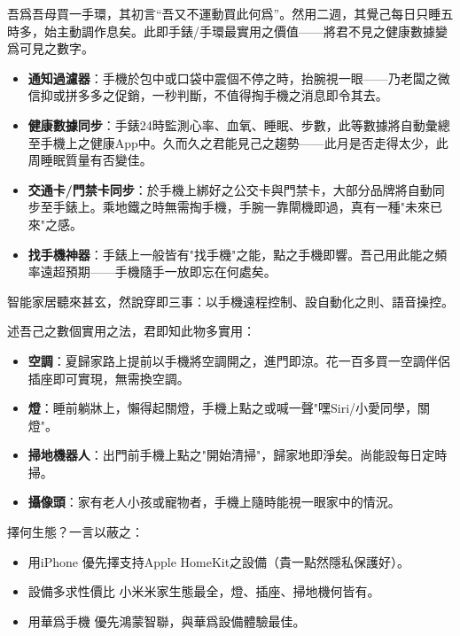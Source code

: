 
吾爲吾母買一手環，其初言“吾又不運動買此何爲”。然用二週，其覺己每日只睡五時多，始主動調作息矣。此即手錶/手環最實用之價值——將君不見之健康數據變爲可見之數字。

\begin{itemize}
  \item \textbf{通知過濾器}：手機於包中或口袋中震個不停之時，抬腕視一眼——乃老闆之微信抑或拼多多之促銷，一秒判斷，不值得掏手機之消息即令其去。
  \item \textbf{健康數據同步}：手錶24時監測心率、血氧、睡眠、步數，此等數據將自動彙總至手機上之健康App中。久而久之君能見己之趨勢——此月是否走得太少，此周睡眠質量有否變佳。
  \item \textbf{交通卡/門禁卡同步}：於手機上綁好之公交卡與門禁卡，大部分品牌將自動同步至手錶上。乘地鐵之時無需掏手機，手腕一靠閘機即過，真有一種"未來已來"之感。
  \item \textbf{找手機神器}：手錶上一般皆有"找手機"之能，點之手機即響。吾己用此能之頻率遠超預期——手機隨手一放即忘在何處矣。
\end{itemize}


智能家居聽來甚玄，然說穿即三事：以手機遠程控制、設自動化之則、語音操控。

述吾己之數個實用之法，君即知此物多實用：

\begin{itemize}
  \item \textbf{空調}：夏歸家路上提前以手機將空調開之，進門即涼。花一百多買一空調伴侶插座即可實現，無需換空調。
  \item \textbf{燈}：睡前躺牀上，懶得起關燈，手機上點之或喊一聲"嘿Siri/小愛同學，關燈"。
  \item \textbf{掃地機器人}：出門前手機上點之"開始清掃"，歸家地即淨矣。尚能設每日定時掃。
  \item \textbf{攝像頭}：家有老人小孩或寵物者，手機上隨時能視一眼家中的情況。
\end{itemize}

擇何生態？一言以蔽之：

\begin{itemize}
  \item 用iPhone 優先擇支持Apple HomeKit之設備（貴一點然隱私保護好）。
  \item 設備多求性價比 小米米家生態最全，燈、插座、掃地機何皆有。
  \item 用華爲手機 優先鴻蒙智聯，與華爲設備體驗最佳。
\end{itemize}

